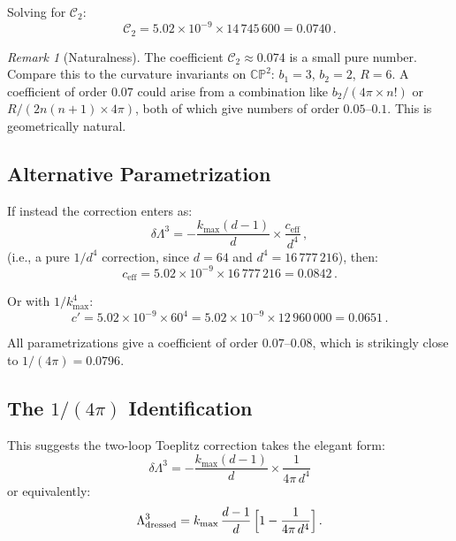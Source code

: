 \documentclass[12pt,a4paper]{article}
\theoremstyle{definition}
\theoremstyle{remark}
\newtheorem{remark}{Remark}
\newcommand{\CP}{\mathbb{CP}}
\begin{document}
Solving for $\mathcal{C}_2$:
\begin{equation}
\mathcal{C}_2 = 5.02 \times 10^{-9} \times 14\,745\,600 = 0.0740\,.
\end{equation}

\begin{remark}[Naturalness]
The coefficient $\mathcal{C}_2 \approx 0.074$ is a small pure number.
Compare this to the curvature invariants on $\CP^2$: $b_1 = 3$, $b_2 = 2$,
$R = 6$. A coefficient of order $0.07$ could arise from a combination like
$b_2/(4\pi \times n!)$ or $R/(2n(n+1) \times 4\pi)$, both of which give
numbers of order $0.05$--$0.1$. This is geometrically natural.
\end{remark}

\subsection{Alternative Parametrization}

If instead the correction enters as:
\begin{equation}
\delta\Lambda^3 = -\frac{k_{\max}(d-1)}{d} \times
\frac{c_{\mathrm{eff}}}{d^4}\,,
\end{equation}
(i.e., a pure $1/d^4$ correction, since $d = 64$ and $d^4 = 16\,777\,216$),
then:
\begin{equation}
c_{\mathrm{eff}} = 5.02 \times 10^{-9} \times 16\,777\,216 = 0.0842\,.
\end{equation}

Or with $1/k_{\max}^4$:
\begin{equation}
c' = 5.02 \times 10^{-9} \times 60^4 = 5.02 \times 10^{-9} \times
12\,960\,000 = 0.0651\,.
\end{equation}

All parametrizations give a coefficient of order $0.07$--$0.08$, which is
strikingly close to $1/(4\pi) = 0.0796$.

\subsection{The $1/(4\pi)$ Identification}

This suggests the two-loop Toeplitz correction takes the elegant form:
\begin{equation}
\boxed{
\delta\Lambda^3 = -\frac{k_{\max}(d-1)}{d} \times
\frac{1}{4\pi\, d^4}
}
\end{equation}
or equivalently:
\begin{equation}
\label{eq:corrected-Lambda3}
\Lambda^3_{\mathrm{dressed}} = k_{\max}\,\frac{d-1}{d}\,
\Bigl[1 - \frac{1}{4\pi\, d^4}\Bigr]\,.
\end{equation}
\end{document}
